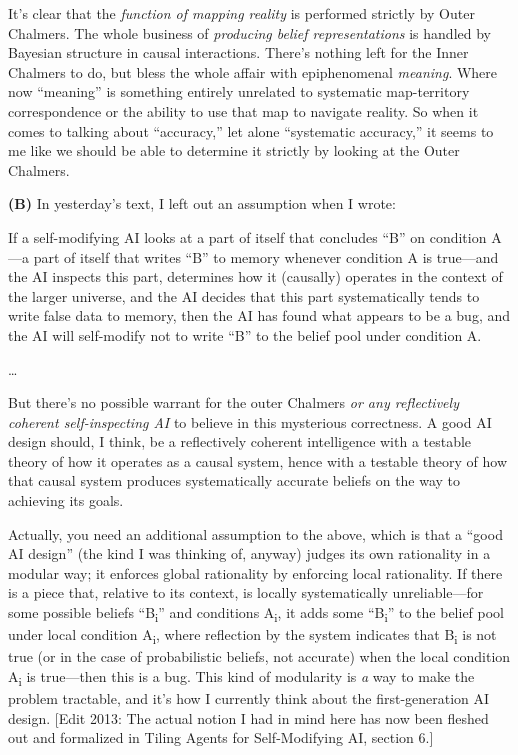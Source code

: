 {
 It's clear that the \textit{function of mapping
reality} is performed strictly by Outer Chalmers. The whole business of
\textit{producing belief representations} is handled by Bayesian
structure in causal interactions. There's nothing left
for the Inner Chalmers to do, but bless the whole affair with
epiphenomenal \textit{meaning}. Where now
``meaning'' is something entirely
unrelated to systematic map-territory correspondence or the ability to
use that map to navigate reality. So when it comes to talking about
``accuracy,'' let alone
``systematic accuracy,'' it seems to
me like we should be able to determine it strictly by looking at the
Outer Chalmers.}

{
 \textbf{(B)} In yesterday's text, I left out an
assumption when I wrote:}

{
 If a self-modifying AI looks at a part of itself that concludes
``B'' on condition A---a part of
itself that writes ``B'' to memory
whenever condition A is true---and the AI inspects this part,
determines how it (causally) operates in the context of the larger
universe, and the AI decides that this part systematically tends to
write false data to memory, then the AI has found what appears to be a
bug, and the AI will self-modify not to write
``B'' to the belief pool under
condition A.}

{
 \ldots}

{
 But there's no possible warrant for the outer
Chalmers \textit{or any reflectively coherent self-inspecting AI} to
believe in this mysterious correctness. A good AI design should, I
think, be a reflectively coherent intelligence with a testable theory
of how it operates as a causal system, hence with a testable theory of
how that causal system produces systematically accurate beliefs on the
way to achieving its goals.}

{
 Actually, you need an additional assumption to the above, which is
that a ``good AI design'' (the kind
I was thinking of, anyway) judges its own rationality in a modular way;
it enforces global rationality by enforcing local rationality. If there
is a piece that, relative to its context, is locally systematically
unreliable---for some possible beliefs
``B\textsubscript{i}'' and
conditions A\textsubscript{i}, it adds some
``B\textsubscript{i}'' to the belief
pool under local condition A\textsubscript{i}, where reflection by the
system indicates that B\textsubscript{i} is not true (or in the case of
probabilistic beliefs, not accurate) when the local condition
A\textsubscript{i} is true---then this is a bug. This kind of
modularity is \textit{a} way to make the problem tractable, and
it's how I currently think about the first-generation
AI design. [Edit 2013: The actual notion I had in mind here has now
been fleshed out and formalized in Tiling Agents for Self-Modifying AI,
section 6.]}

